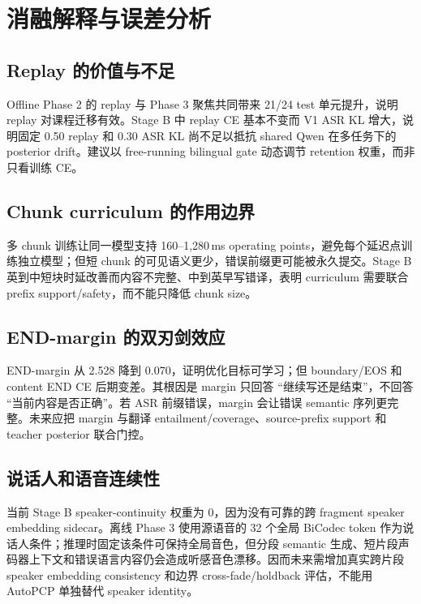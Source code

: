 \documentclass[11pt,a4paper]{article}
\begin{document}
\section{消融解释与误差分析}

\subsection{Replay 的价值与不足}

Offline Phase 2 的 replay 与 Phase 3 聚焦共同带来 21/24 test 单元提升，说明 replay 对课程迁移有效。Stage B 中 replay CE 基本不变而 V1 ASR KL 增大，说明固定 0.50 replay 和 0.30 ASR KL 尚不足以抵抗 shared Qwen 在多任务下的 posterior drift。建议以 free-running bilingual gate 动态调节 retention 权重，而非只看训练 CE。

\subsection{Chunk curriculum 的作用边界}

多 chunk 训练让同一模型支持 160--1,280\,ms operating points，避免每个延迟点训练独立模型；但短 chunk 的可见语义更少，错误前缀更可能被永久提交。Stage B 英到中短块时延改善而内容不完整、中到英早写错译，表明 curriculum 需要联合 prefix support/safety，而不能只降低 chunk size。

\subsection{END-margin 的双刃剑效应}

END-margin 从 2.528 降到 0.070，证明优化目标可学习；但 boundary/EOS 和 content END CE 后期变差。其根因是 margin 只回答 ``继续写还是结束''，不回答 ``当前内容是否正确''。若 ASR 前缀错误，margin 会让错误 semantic 序列更完整。未来应把 margin 与翻译 entailment/coverage、source-prefix support 和 teacher posterior 联合门控。

\subsection{说话人和语音连续性}

当前 Stage B speaker-continuity 权重为 0，因为没有可靠的跨 fragment speaker embedding sidecar。离线 Phase 3 使用源语音的 32 个全局 BiCodec token 作为说话人条件；推理时固定该条件可保持全局音色，但分段 semantic 生成、短片段声码器上下文和错误语言内容仍会造成听感音色漂移。因而未来需增加真实跨片段 speaker embedding consistency 和边界 cross-fade/holdback 评估，不能用 AutoPCP 单独替代 speaker identity。
\end{document}
